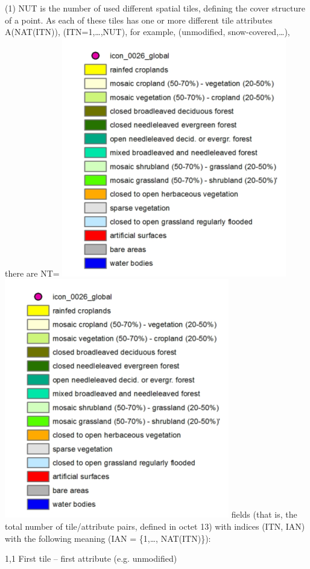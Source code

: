 (1) NUT is the number of used different spatial tiles, defining the cover structure of a point. As each of these tiles has one or more different tile attributes A(NAT(ITN)), (ITN=1,\ldots,NUT), for example, (unmodified, snow-covered,\ldots), there are NT= \includegraphics{../tex/extracted-media/media/image2.png}\includegraphics{../tex/extracted-media/media/image2.png} fields (that is, the total number of tile/attribute pairs, defined in octet 13) with indices (ITN, IAN) with the following meaning (IAN = \{1,\ldots, NAT(ITN)\}):

1,1 First tile -- first attribute (e.g. unmodified)


